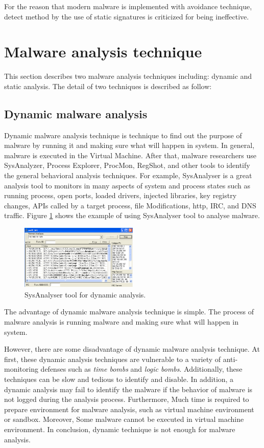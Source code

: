 For the reason that modern malware is implemented with avoidance technique, detect method by the use of static signatures is criticized for being ineffective.   
\section{Malware analysis technique}
This section describes two malware analysis techniques including: dynamic and static analysis. The detail of two techniques is described as follow: 
\subsection{Dynamic malware analysis}
Dynamic malware analysis technique is technique to find out the purpose of malware by running it and making sure what will happen in system. In general, malware is executed in the Virtual Machine. After that, malware researchers use SysAnalyzer, Process Explorer, ProcMon, RegShot, and other tools to identify the general behavioral analysis techniques. For example, SysAnalyser is a great analysis tool to monitors in many aspects of system and process states such as running process, open ports, loaded drivers, injected libraries, key registry changes, APIs called by a target process, file Modifications, http, IRC, and DNS traffic. Figure \ref{fig:SysAnalyser} shows the example of using SysAnalyser tool to analyse malware. 


\begin{figure}[h!]
\centering
\includegraphics[width=0.5\textwidth]{graph/SysAnalyser.png}
\caption{SysAnalyser tool for dynamic analysis.}
\label{fig:SysAnalyser}
\end{figure}

The advantage of dynamic malware analysis technique is simple. The process of malware analysis is running malware and making sure what will happen in 
system.

However, there are some disadvantage of dynamic malware analysis technique. At first, these dynamic analysis techniques are vulnerable to a variety of anti-monitoring defenses such as \emph{time bombs} and \emph{logic bombs}. Additionally, these techniques can be slow and tedious to identify and disable. In addition, a dynamic analysis may fail to identify the malware if the behavior of malware is not logged during the analysis process. Furthermore, Much time is required to prepare environment for malware analysis, such as virtual machine environment or sandbox. Moreover, Some malware cannot be executed in virtual machine environment. In conclusion, dynamic technique is not enough for malware analysis. 

